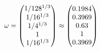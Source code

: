 \documentclass[10pt,a4paper]{article}
\begin{document}
	\[
		\bold{\omega} = 
		\begin{pmatrix}
			{1} / {{128^ {1 / 3}}} \\
			{1} / {{16^ {1 / 3}}} \\
			{1} / {{4^ {1 / 3}}} \\
			{1}{} \\
			{1} / {{16^ {1 / 3}}} \\
		\end{pmatrix}
		\approx
		\begin{pmatrix}
			0.1984   \\
			0.3969   \\
			0.63     \\
			1        \\
			0.3969   \\
		\end{pmatrix}
	\]
\end{document}

